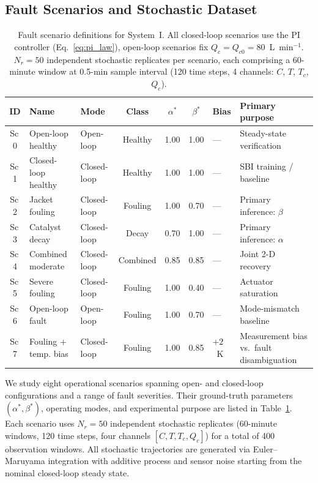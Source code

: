 \documentclass[aps,pre,twocolumn,superscriptaddress,floatfix]{revtex4-2}
\begin{document}
\subsection{Fault Scenarios and Stochastic Dataset}
\label{sec:scenarios}

\begin{table}[tbp]
\centering
\caption{Fault scenario definitions for System~I.  All closed-loop scenarios
  use the PI controller (Eq.~\eqref{eq:pi_law}), open-loop scenarios fix
  $Q_c = Q_{c0} = 80$~L~min$^{-1}$. $N_r = 50$ independent stochastic
  replicates per scenario, each comprising a 60-minute window at
  0.5-min sample interval (120 time steps, 4 channels:
  $C$, $T$, $T_c$, $Q_c$).}
\label{tab:scenarios_system1}
\small
\begin{tabular}{cllcccll}
\toprule
ID & Name & Mode & Class & $\alpha^*$ & $\beta^*$ & Bias & Primary purpose \\
\midrule
Sc\,0 & Open-loop healthy      & Open-loop   & Healthy  & 1.00 & 1.00 & ---    & Steady-state verification \\
Sc\,1 & Closed-loop healthy    & Closed-loop & Healthy  & 1.00 & 1.00 & ---    & SBI training / baseline \\
Sc\,2 & Jacket fouling         & Closed-loop & Fouling  & 1.00 & 0.70 & ---    & Primary inference: $\beta$ \\
Sc\,3 & Catalyst decay         & Closed-loop & Decay    & 0.70 & 1.00 & ---    & Primary inference: $\alpha$ \\
Sc\,4 & Combined moderate      & Closed-loop & Combined & 0.85 & 0.85 & ---    & Joint 2-D recovery \\
Sc\,5 & Severe fouling         & Closed-loop & Fouling  & 1.00 & 0.40 & ---    & Actuator saturation \\
Sc\,6 & Open-loop fault        & Open-loop   & Fouling  & 1.00 & 0.70 & ---    & Mode-mismatch baseline \\
Sc\,7 & Fouling + temp. bias & Closed-loop & Fouling  & 1.00 & 0.85 & $+2$~K & Measurement bias vs.\ fault disambiguation \\
\bottomrule
\end{tabular}
\end{table}

We study eight operational scenarios spanning open- and closed-loop configurations and
 a range of fault severities. Their ground-truth parameters $(\alpha^*,\beta^*)$, 
 operating modes, and experimental purpose are listed in Table~\ref{tab:scenarios_system1}. 
 Each scenario uses $N_r = 50$ independent stochastic replicates (60-minute windows, 
 120 time steps, four channels $[C, T, T_c, Q_c]$) for a total of 400 observation windows. 
 All stochastic trajectories are generated via Euler--Maruyama integration with additive 
 process and sensor noise starting from the nominal closed-loop steady state.
\end{document}
